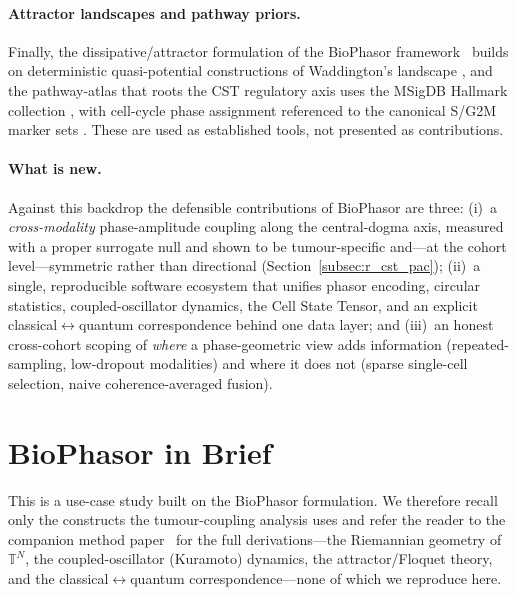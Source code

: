 \documentclass[preprint,12pt,amsmath,amssymb,superscriptaddress,floatfix]{revtex4-2}
\newcommand{\torus}{\mathbb{T}}
\begin{document}
\paragraph{Attractor landscapes and pathway priors.}
Finally, the dissipative/attractor formulation of the BioPhasor
framework~\cite{biophasor_platform}
builds on deterministic quasi-potential constructions of Waddington's landscape
\citep{bhattacharya2011}, and the pathway-atlas that roots the CST regulatory
axis uses the MSigDB Hallmark collection \citep{liberzon2015}, with cell-cycle
phase assignment referenced to the canonical S/G2M marker sets \citep{tirosh2016}.
These are used as established tools, not presented as contributions.

\paragraph{What is new.}
Against this backdrop the defensible contributions of BioPhasor are three:
(i)~a \emph{cross-modality} phase-amplitude coupling along the central-dogma
axis, measured with a proper surrogate null and shown to be tumour-specific
and---at the cohort level---symmetric rather than directional
(Section~\ref{subsec:r_cst_pac}); (ii)~a single, reproducible
software ecosystem that unifies phasor encoding, circular statistics,
coupled-oscillator dynamics, the Cell State Tensor, and an explicit
classical$\leftrightarrow$quantum correspondence behind one data layer; and
(iii)~an honest cross-cohort scoping of \emph{where} a phase-geometric view adds
information (repeated-sampling, low-dropout modalities) and where it does not
(sparse single-cell selection, naive coherence-averaged fusion).


\section{BioPhasor in Brief}
\label{sec:biophasor_brief}

This is a use-case study built on the BioPhasor formulation. We therefore recall
only the constructs the tumour-coupling analysis uses and refer the reader to the
companion method paper~\cite{biophasor_platform} for the full derivations---the
Riemannian geometry of $\torus^N$, the coupled-oscillator (Kuramoto) dynamics, the
attractor/Floquet theory, and the classical$\leftrightarrow$quantum
correspondence---none of which we reproduce here.
\end{document}

